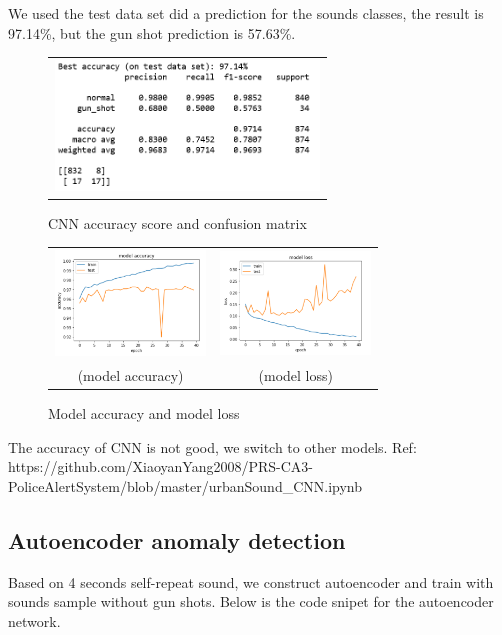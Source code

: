 \documentclass{article}
\begin{document}
We used the test data set did a prediction for the sounds classes, the result is 97.14\%, but the gun shot prediction is 57.63\%.
\begin{figure}[!htb]
	\begin{tabular}{c}
		\includegraphics[width=7cm]{pic/CNN_Pm_V2.PNG}\\
	\end{tabular}
	\caption{CNN accuracy score and confusion matrix\label{figure9}}
\end{figure}

\begin{figure}[!htb]
	\begin{tabular}{cc}
		\includegraphics[width=4cm]{pic/CNN_ACC_V2.PNG}
		&\includegraphics[width=4cm]{pic/CNN_Loss_V2.PNG}\\
		(model accuracy)&(model loss)
	\end{tabular}
	\caption{Model accuracy and model loss\label{figure10}}
\end{figure}
The accuracy of CNN is not good, we switch to other models.
Ref: https://github.com/XiaoyanYang2008/PRS-CA3-PoliceAlertSystem/blob/master/urbanSound\_CNN.ipynb

\newpage
\subsection{Autoencoder anomaly detection}
Based on 4 seconds self-repeat sound, we construct autoencoder and train with sounds sample without gun shots. Below is the code snipet for the autoencoder network.
\end{document}
